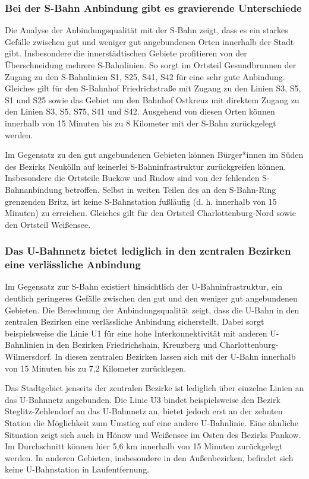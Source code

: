 \subsubsection{Bei der S-Bahn Anbindung gibt es gravierende Unterschiede}
Die Analyse der Anbindungsqualität mit der S-Bahn zeigt, dass es ein starkes Gefälle zwischen gut und weniger gut angebundenen Orten innerhalb der Stadt gibt. Insbesondere die innerstädtischen Gebiete profitieren von der Überschneidung mehrere S-Bahnlinien. So sorgt im Ortsteil Gesundbrunnen der Zugang zu den S-Bahnlinien S1, S25, S41, S42 für eine sehr gute Anbindung. Gleiches gilt für den S-Bahnhof Friedrichstraße mit Zugang zu den Linien S3, S5, S1 und S25 sowie das Gebiet um den Bahnhof Ostkreuz mit direktem Zugang zu den Linien S3, S5, S75, S41 und S42. Ausgehend von diesen Orten können innerhalb von 15 Minuten bis zu 8 Kilometer mit der S-Bahn zurückgelegt werden.


Im Gegensatz zu den gut angebundenen Gebieten können Bürger*innen im Süden des Bezirks Neukölln auf keinerlei S-Bahninfrastruktur zurückgreifen können. Insbesondere die Ortsteile Buckow und Rudow sind von der fehlenden S-Bahnanbindung betroffen. Selbst in weiten Teilen des an den S-Bahn-Ring grenzenden Britz, ist keine S-Bahnstation fußläufig (d. h. innerhalb von 15 Minuten) zu erreichen. Gleiches gilt für den Ortsteil Charlottenburg-Nord sowie den Ortsteil Weißensee.


\subsubsection{Das U-Bahnnetz bietet lediglich in den zentralen Bezirken eine verlässliche Anbindung}
Im Gegensatz zur S-Bahn existiert hinsichtlich der U-Bahninfrastruktur, ein deutlich geringeres Gefälle zwischen den gut und den weniger gut angebundenen Gebieten. Die Berechnung der Anbindungsqualität zeigt, dass die U-Bahn in den zentralen Bezirken eine verlässliche Anbindung sicherstellt. Dabei sorgt beispielsweise die Linie U1 für eine hohe Interkonnektivität mit anderen U-Bahnlinien in den Bezirken Friedrichshain, Kreuzberg und Charlottenburg-Wilmersdorf. In diesen zentralen Bezirken lassen sich mit der U-Bahn innerhalb von 15 Minuten bis zu 7,2 Kilometer zurücklegen.


Das Stadtgebiet jenseits der zentralen Bezirke ist lediglich über einzelne Linien an das U-Bahnnetz angebunden. Die Linie U3 bindet beispielsweise den Bezirk Steglitz-Zehlendorf an das U-Bahnnetz an, bietet jedoch erst an der zehnten Station die Möglichkeit zum Umstieg auf eine andere U-Bahnlinie. Eine ähnliche Situation zeigt sich auch in Hönow und Weißensee im Osten des Bezirks Pankow. Im Durchschnitt können hier 5,6 km innerhalb von 15 Minuten zurückgelegt werden. In anderen Gebieten, insbesondere in den Außenbezirken, befindet sich keine U-Bahnstation in Laufentfernung.


